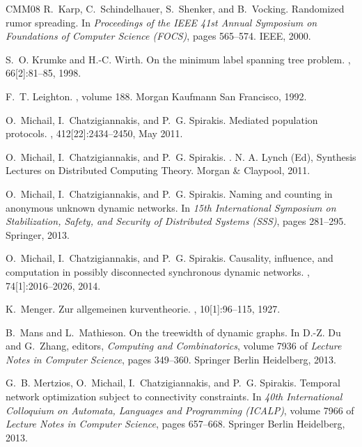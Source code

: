 \documentclass[oribibl, 11pt]{llncs}
\begin{document}
\begin{thebibliography}{CMM{\etalchar{+}}08}
R.~Karp, C.~Schindelhauer, S.~Shenker, and B.~Vocking.
\newblock Randomized rumor spreading.
\newblock In {\em Proceedings of the IEEE 41st Annual Symposium on Foundations
  of Computer Science (FOCS)}, pages 565--574. IEEE, 2000.

S.~O. Krumke and H.-C. Wirth.
\newblock On the minimum label spanning tree problem.
, 66[2]:81--85, 1998.

F.~T. Leighton.
, volume
  188.
\newblock Morgan Kaufmann San Francisco, 1992.

O.~Michail, I.~Chatzigiannakis, and P.~G. Spirakis.
\newblock Mediated population protocols.
, 412[22]:2434--2450, May 2011.

O.~Michail, I.~Chatzigiannakis, and P.~G. Spirakis.
.
\newblock N. A. Lynch (Ed), Synthesis Lectures on Distributed Computing Theory.
  Morgan \& Claypool, 2011.

O.~Michail, I.~Chatzigiannakis, and P.~G. Spirakis.
\newblock Naming and counting in anonymous unknown dynamic networks.
\newblock In {\em 15th International Symposium on Stabilization, Safety, and
  Security of Distributed Systems (SSS)}, pages 281--295. Springer, 2013.

O.~Michail, I.~Chatzigiannakis, and P.~G. Spirakis.
\newblock Causality, influence, and computation in possibly disconnected
  synchronous dynamic networks.
,
  74[1]:2016--2026, 2014.

K.~Menger.
\newblock Zur allgemeinen kurventheorie.
, 10[1]:96--115, 1927.

B.~Mans and L.~Mathieson.
\newblock On the treewidth of dynamic graphs.
\newblock In D.-Z. Du and G.~Zhang, editors, {\em Computing and Combinatorics},
  volume 7936 of {\em Lecture Notes in Computer Science}, pages 349--360.
  Springer Berlin Heidelberg, 2013.

G.~B. Mertzios, O.~Michail, I.~Chatzigiannakis, and P.~G. Spirakis.
\newblock Temporal network optimization subject to connectivity constraints.
\newblock In {\em 40th International Colloquium on Automata, Languages and
  Programming (ICALP)}, volume 7966 of {\em Lecture Notes in Computer Science},
  pages 657--668. Springer Berlin Heidelberg, 2013.


\end{thebibliography}
\end{document}
